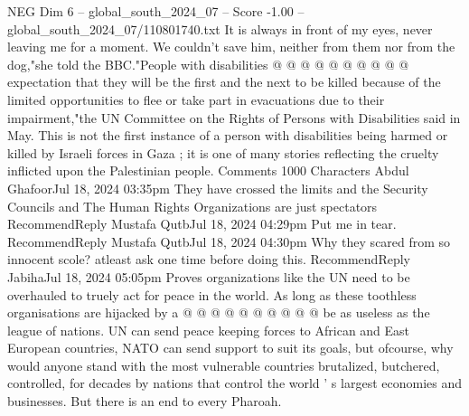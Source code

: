 \begin{textsample}{NEG Dim 6 – global\_south\_2024\_07 – Score -1.00 – global\_south\_2024\_07/110801740.txt}
It is always in front of my eyes, never leaving me for a moment.
We couldn't save him, neither from them nor from the dog,"she told the BBC."People with disabilities @ @ @ @ @ @ @ @ @ @ expectation that they will be the first and the next to be killed because of the limited opportunities to flee or take part in evacuations due to their impairment,"the UN Committee on the Rights of Persons with Disabilities said in May.
This is not the first instance of a person with disabilities being harmed or killed by Israeli forces in Gaza ; it is one of many stories reflecting the cruelty inflicted upon the Palestinian people.
Comments 1000 Characters Abdul GhafoorJul 18, 2024 03:35pm They have crossed the limits and the Security Councils and The Human Rights Organizations are just spectators RecommendReply Mustafa QutbJul 18, 2024 04:29pm Put me in tear.
RecommendReply Mustafa QutbJul 18, 2024 04:30pm Why they scared from so innocent scole? atleast ask one time before doing this.
RecommendReply JabihaJul 18, 2024 05:05pm Proves organizations like the UN need to be overhauled to truely act for peace in the world.
As long as these toothless organisations are hijacked by a @ @ @ @ @ @ @ @ @ @ be as useless as the league of nations.
UN can send peace keeping forces to African and East European countries, NATO can send support to suit its goals, but ofcourse, why would anyone stand with the most vulnerable countries brutalized, butchered, controlled, for decades by nations that control the world ' s largest economies and businesses.
But there is an end to every Pharoah.

\end{textsample}
